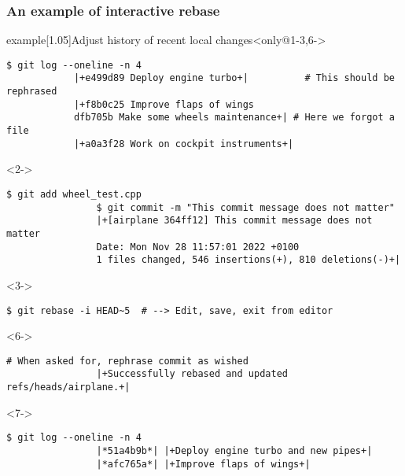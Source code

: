 \documentclass[usenames,svgnames,14pt]{beamer}
\begin{document}
\begin{frame}[c,fragile]
    \frametitle<1-3,6->{An example of interactive rebase}
    \begin{varblock}{example}[1.05\textwidth]{Adjust history of recent local changes}<only@1-3,6->
        \begin{lstlisting}[style=MyBash, aboveskip=2mm]
            $ git log --oneline -n 4
            |+e499d89 Deploy engine turbo+|          # This should be rephrased
            |+f8b0c25 Improve flaps of wings
            dfb705b Make some wheels maintenance+| # Here we forgot a file
            |+a0a3f28 Work on cockpit instruments+|
        \end{lstlisting}
        \begin{uncoverenv}<2->
            \begin{lstlisting}[style=MyBash, aboveskip=-4pt]
                $ git add wheel_test.cpp
                $ git commit -m "This commit message does not matter"
                |+[airplane 364ff12] This commit message does not matter
                Date: Mon Nov 28 11:57:01 2022 +0100
                1 files changed, 546 insertions(+), 810 deletions(-)+|
            \end{lstlisting}
        \end{uncoverenv}
        \begin{uncoverenv}<3->
            \begin{lstlisting}[style=MyBash, aboveskip=-4pt]
                $ git rebase -i HEAD~5  # --> Edit, save, exit from editor
            \end{lstlisting}
        \end{uncoverenv}
        \begin{uncoverenv}<6->
            \begin{lstlisting}[style=MyBash, aboveskip=-4pt]
                # When asked for, rephrase commit as wished
                |+Successfully rebased and updated refs/heads/airplane.+|
            \end{lstlisting}
        \end{uncoverenv}
        \begin{uncoverenv}<7->
            \begin{lstlisting}[style=MyBash, aboveskip=-4pt]
                $ git log --oneline -n 4
                |*51a4b9b*| |+Deploy engine turbo and new pipes+|
                |*afc765a*| |+Improve flaps of wings+|

\end{lstlisting}
\end{uncoverenv}
\end{varblock}
\end{frame}
\end{document}

